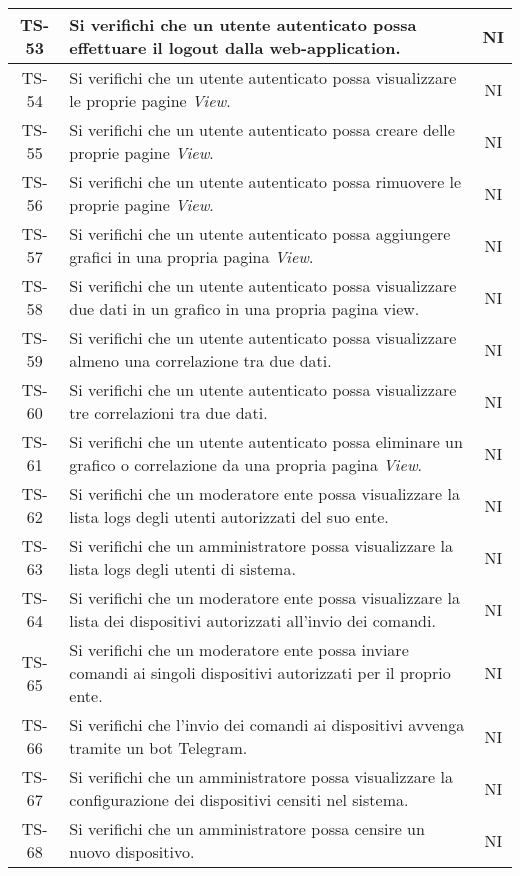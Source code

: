 \begin{center}
\begin{longtable}{|c|p{10cm}|c|}
			 \hline
			 TS-53 & Si verifichi che un utente autenticato possa effettuare il logout dalla web-application. & NI \\
			 \hline
			 TS-54 & Si verifichi che un utente autenticato possa visualizzare le proprie pagine \textit{View}. & NI \\
			 \hline
			 TS-55 & Si verifichi che un utente autenticato possa creare delle proprie pagine \textit{View}. & NI \\
			 \hline
			 TS-56 & Si verifichi che un utente autenticato possa rimuovere le proprie pagine \textit{View}. & NI \\
			 \hline
			 TS-57 & Si verifichi che un utente autenticato possa aggiungere grafici in una propria pagina  \textit{View}. & NI \\
			 \hline
			 TS-58 & Si verifichi che un utente autenticato possa visualizzare due dati in un grafico in una propria pagina view. & NI \\
			 \hline
			 TS-59 & Si verifichi che un utente autenticato possa visualizzare almeno una correlazione tra due dati. & NI \\
			 \hline
			 TS-60 & Si verifichi che un utente autenticato possa visualizzare tre correlazioni tra due dati. & NI \\
			 \hline
			 TS-61 & Si verifichi che un utente autenticato possa eliminare un grafico o correlazione da una propria pagina \textit{View}. & NI \\
			 \hline
			 TS-62 & Si verifichi che un moderatore ente possa visualizzare la lista logs degli utenti autorizzati del suo ente. & NI \\
			 \hline
			 TS-63 & Si verifichi che un amministratore possa visualizzare la lista logs degli utenti di sistema. & NI \\
			 \hline
			 TS-64 & Si verifichi che un moderatore ente possa visualizzare la lista dei dispositivi autorizzati all'invio dei comandi. & NI \\
			 \hline
			 TS-65 & Si verifichi che un moderatore ente possa inviare comandi ai singoli dispositivi autorizzati per il proprio ente. & NI \\
			 \hline
			 TS-66 & Si verifichi che l'invio dei comandi ai dispositivi avvenga tramite un bot Telegram. & NI \\
			 \hline
			 TS-67 & Si verifichi che un amministratore possa visualizzare la configurazione dei dispositivi censiti nel sistema. & NI \\
			 \hline
			 TS-68 & Si verifichi che un amministratore possa censire un nuovo dispositivo. & NI \\

\end{longtable}
\end{center}
